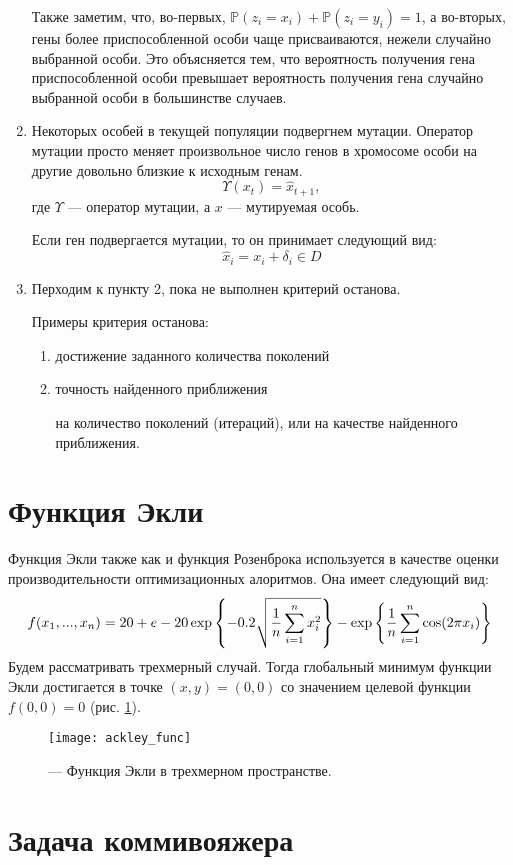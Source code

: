 \begin{enumerate}
Также заметим, что, во-первых, $\mathbb{P}(z_i = x_i) + \mathbb{P}(z_i = y_i) = 1$, а во-вторых,  гены более приспособленной особи чаще присваиваются, нежели случайно выбранной особи. Это объясняется тем, что вероятность получения гена приспособленной особи превышает вероятность  получения гена случайно выбранной особи в большинстве случаев.

\item Некоторых особей в текущей популяции подвергнем мутации. Оператор мутации просто меняет произвольное число генов в хромосоме особи на другие довольно близкие к исходным генам.
\[
	\Upsilon(x_t) = \hat{x}_{t+1},
\]
где $\Upsilon$ --- оператор мутации, а $x$ --- мутируемая особь.

Если ген подвергается мутации, то он принимает следующий вид:
\[
\hat{x}_i
= x_i + \delta_i \in D
\]
	\item Перходим к пункту 2, пока не выполнен критерий останова.

	Примеры критерия останова:
	\begin{enumerate}
		\item достижение заданного количества поколений
		\item точность найденного приближения

на количество поколений (итераций), или на качестве найденного приближения.
	\end{enumerate}
\end{enumerate}

\section{Функция Экли}
\noindent
Функция Экли также как и функция Розенброка используется в качестве оценки производительности оптимизационных алоритмов. Она имеет следующий вид:
 \[
 	f(x_1, ..., x_n)
	=
	20
	+
	e
	-20\exp\left\{-0.2
	\sqrt{\dfrac{1}{n}
	\sum_{i=1}^n \limits x^2_i}
	\right\}
	-
	\exp\left\{
	\dfrac{1}{n}
	\sum_{i=1}^n \limits
	\cos(2\pi x_i)
	\right\}
 \]
 Будем рассматривать трехмерный случай. Тогда глобальный минимум функции Экли достигается в точке $(x, y) = (0, 0)$ со значением целевой функции $f(0, 0) = 0$ (рис. \ref{img:ackley_func}).

 \begin{figure}[h!]
 	\centering
   \texttt{[image: ackley\_func]}
   \caption{ --- Функция Экли в трехмерном пространстве.}
   \label{img:ackley_func}
 \end{figure}

\section{Задача коммивояжера}
